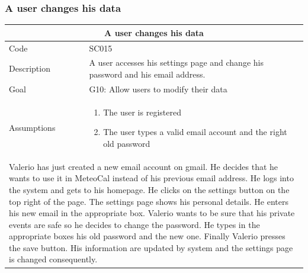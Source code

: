 \documentclass[10pt,a4paper,titlepage]{article}
\begin{document}
\subsubsection{A user changes his data}
\begin{tabular}{| p{3cm} | p{10cm} |}
\hline \multicolumn{2}{|c|}{\textbf{A user changes his data}} \\ 
\hline Code & SC015 \\ 
\hline Description & A user accesses his settings page and change his password and his email address.\\
\hline Goal & G10: Allow users to modify their data\\
\hline Assumptions  & \begin{enumerate}
\item The user is registered
\item The user types a valid email account and the right old password
\end{enumerate} \\
\hline \multicolumn{2}{|p{13cm}|}{Valerio has just created a new email account on gmail. He decides that he wants to use it in MeteoCal instead of his previous email address. He logs into the system and gets to his homepage. He clicks on the settings button on the top right of the page. The settings page shows his personal details. He enters his new email in the appropriate box. Valerio wants to be sure that his private events are safe so he decides to change the password. He types in the appropriate boxes his old password and the new one. Finally Valerio presses the save button. His information are updated by system and the settings page is changed consequently. }\\
\hline
\end{tabular}
\end{document}
